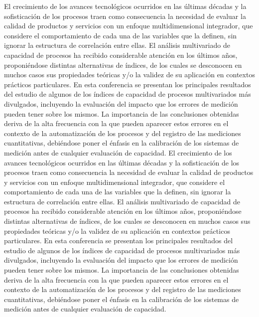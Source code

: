 \noindent El crecimiento de los avances tecnológicos ocurridos en las últimas décadas y la sofisticación de los procesos traen como consecuencia la necesidad de evaluar la calidad de productos y servicios con un enfoque multidimensional integrador, que considere el comportamiento de cada una de las variables que la definen, sin ignorar la estructura de correlación entre ellas. El análisis multivariado de capacidad de procesos ha recibido considerable atención en los últimos años, proponiéndose distintas alternativas de índices, de los cuales se desconocen en muchos casos sus propiedades teóricas y/o la validez de su aplicación en contextos prácticos particulares. En esta conferencia se presentan los principales resultados del estudio de algunos de los índices de capacidad de procesos multivariados más divulgados, incluyendo la evaluación del impacto que los errores de medición pueden tener sobre los mismos. La importancia de las conclusiones obtenidas deriva de la alta frecuencia con la que pueden aparecer estos errores en el contexto de la automatización de los procesos y del registro de las mediciones cuantitativas, debiéndose poner el énfasis en la calibración de los sistemas de medición antes de cualquier evaluación de capacidad. El crecimiento de los avances tecnológicos ocurridos en las últimas décadas y la sofisticación de los procesos traen como consecuencia la necesidad de evaluar la calidad de productos y servicios con un enfoque multidimensional integrador, que considere el comportamiento de cada una de las variables que la definen, sin ignorar la estructura de correlación entre ellas. El análisis multivariado de capacidad de procesos ha recibido considerable atención en los últimos años, proponiéndose distintas alternativas de índices, de los cuales se desconocen en muchos casos sus propiedades teóricas y/o la validez de su aplicación en contextos prácticos particulares. En esta conferencia se presentan los principales resultados del estudio de algunos de los índices de capacidad de procesos multivariados más divulgados, incluyendo la evaluación del impacto que los errores de medición pueden tener sobre los mismos. La importancia de las conclusiones obtenidas deriva de la alta frecuencia con la que pueden aparecer estos errores en el contexto de la automatización de los procesos y del registro de las mediciones cuantitativas, debiéndose poner el énfasis en la calibración de los sistemas de medición antes de cualquier evaluación de capacidad.

